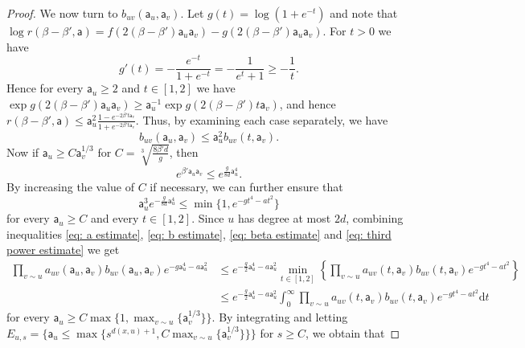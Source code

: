 \documentclass[11pt,a4paper]{article}
\theoremstyle{definition}
\numberwithin{equation}{section}
\begin{document}
\begin{proof}
We now turn to $b_{uv}(\mathsf{a}_u,\mathsf{a}_v)$. Let $g(t)=\log(1+e^{-t})$ and note that $\log r(\beta-\beta',\mathsf{a})=f(2(\beta-\beta')\mathsf{a}_u \mathsf{a}_v)-g(2(\beta-\beta')\mathsf{a}_u \mathsf{a}_v)$.
For $t>0$ we have
\begin{equation}
g'(t)=-\frac{e^{-t}}{1+e^{-t}}=-\frac{1}{e^t+1}\geq -\frac{1}{t}.   
\end{equation}
Hence for every $\mathsf{a}_u\geq 2$ and $t\in [1,2]$ we have 
$\exp g(2(\beta-\beta')\mathsf{a}_u \mathsf{a}_v)\geq \mathsf{a}_u^{-1} \exp g(2(\beta-\beta')t \mathsf{a}_v)$, and hence $r(\beta-\beta',\mathsf{a}) \leq \mathsf a_u^2 \frac{1-e^{-2\beta' t \mathsf a_v}}{1+e^{-2\beta' t \mathsf a_v}}.$
Thus, by examining each case separately, we have
\begin{equation}\label{eq: b estimate}
b_{uv}(\mathsf{a}_u,\mathsf{a}_v)\leq \mathsf{a}_u^2 b_{uv}(t,\mathsf{a}_v).    
\end{equation}
Now if $\mathsf{a}_u\geq C\mathsf{a}_v^{1/3}$ for $C=\sqrt[3]{\frac{8\beta' d}{g}}$, then
\begin{equation}\label{eq: beta estimate}
e^{\beta' \mathsf{a}_u \mathsf{a}_v}\leq e^{\frac{g}{8d}\mathsf{a}_u^4}.    
\end{equation}
By increasing the value of $C$ if necessary, we can further ensure that 
\begin{equation}\label{eq: third power estimate}
\mathsf{a}_u^3 e^{-\frac{g}{8d}\mathsf{a}_u^4}\leq \min\{1,e^{-gt^4-at^2} \}    
\end{equation}
for every $\mathsf{a}_u\geq C$ and every $t\in [1,2]$. Since $u$ has degree at most $2d$, combining inequalities \eqref{eq: a estimate}, \eqref{eq: b estimate}, \eqref{eq: beta estimate} and \eqref{eq: third power estimate} we get
\begin{equation}
\begin{aligned}
\prod_{v\sim u} a_{uv}(\mathsf{a}_u,\mathsf{a}_v)b_{uv}(\mathsf{a}_u,\mathsf{a}_v)e^{-g\mathsf{a}_u^4-a\mathsf{a}_u^2}&\leq e^{-\frac{g}{2}\mathsf{a}_u^4-a\mathsf{a}_u^2}\min_{t\in [1,2]}\left\{\prod_{v \sim u} a_{uv}(t,\mathsf{a}_v) b_{uv}(t,\mathsf{a}_v) e^{-gt^4-at^2}\right\} \\
&\leq   e^{-\frac{g}{2}\mathsf{a}_u^4-a\mathsf{a}_u^2} \int_0^\infty \prod_{v \sim u} a_{uv}(t,\mathsf{a}_v)  b_{uv}(t,\mathsf{a}_v) e^{-gt^4-at^2}\mathrm{d} t  
\end{aligned}
\end{equation}
for every $\mathsf{a}_u\geq C\max\{1,\max_{v\sim u}\{\mathsf{a}_v^{1/3}\}\}$.
By integrating and letting $E_{u,s}=\{\mathsf{a}_u\leq \max\{s^{d(x,u)+1},C\max_{v\sim u}\{\mathsf{a}_v^{1/3}\}\}\}$ for $s\geq C$, we obtain that 

\end{proof}
\end{document}
